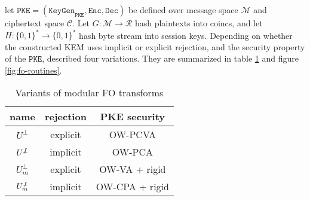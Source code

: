 \documentclass[floatrow,journal=tches,submission]{iacrtrans}
\newcommand{\pke}{\texttt{PKE}}
\newcommand{\keygen}{\texttt{KeyGen}}
\newcommand{\encrypt}{\texttt{Enc}}
\newcommand{\decrypt}{\texttt{Dec}}
\begin{document}
let $\pke = (\keygen_\pke, \encrypt, \decrypt)$ be defined over message space $\mathcal{M}$ and ciphertext space $\mathcal{C}$. Let $G: \mathcal{M} \rightarrow \mathcal{R}$ hash plaintexts into coincs, and let $H: \{0,1\}^\ast \rightarrow \{0,1\}^\ast$ hash byte stream into session keys. Depending on whether the constructed KEM uses implicit or explicit rejection, and the security property of the $\pke$, \cite{hofheinz2017modular} described four variations. They are summarized in table \ref{tbl:fo-variations} and figure \ref{fig:fo-routines}.

\begin{table}[H]
    \centering
    \begin{tabular}{|c|c|c|}
        \hline
        name & rejection & PKE security \\
        \hline
        $U^\bot$ & explicit & OW-PCVA \\
        \hline
        $U^{\not\bot}$ & implicit & OW-PCA \\
        \hline
        $U^\bot_m$ & explicit & OW-VA + rigid \\
        \hline
        $U^{\not\bot}_m$ & implicit & OW-CPA + rigid \\
        \hline
    \end{tabular}
    \caption{Variants of modular FO transforms}\label{tbl:fo-variations}
\end{table}
\end{document}
